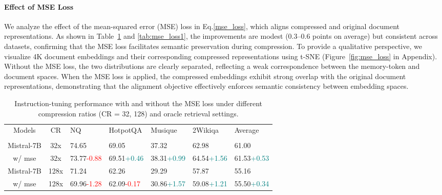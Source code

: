 \documentclass{applemlr}
\numberwithin{equation}{section}
\begin{document}
\paragraph{Effect of MSE Loss}



We analyze the effect of the mean-squared error (MSE) loss in Eq.\ref{mse_loss}, which aligns compressed and original document representations.
As shown in Table~\ref{tab:mse_loss} and \ref{tab:mse_loss1}, the improvements are modest (0.3–0.6 points on average) but consistent across datasets, confirming that the MSE loss facilitates semantic preservation during compression. To provide a qualitative perspective, we visualize 4K document embeddings and their corresponding compressed representations using t-SNE (Figure~\ref{fig:mse_loss} in Appendix). 
Without the MSE loss, the two distributions are clearly separated, reflecting a weak correspondence between the memory-token and document spaces. When the MSE loss is applied, the compressed embeddings exhibit strong overlap with the original document representations, demonstrating that the alignment objective effectively enforces semantic consistency between embedding spaces. 







\begin{table}[H]
\centering
\scriptsize
\begin{tabular}{cclllll}
\bottomrule
Models & CR & NQ & HotpotQA& Musique& 2Wikiqa & Average \\
\rowcolor{gray!15}
\multicolumn{7}{c}{\textbf{Oracle}} \\
Mistral-7B & 32x & 74.65 & 69.05 & 37.32 & 62.98 & 61.00 \\
\qquad w/ mse & 32x & 73.77{\tiny\textcolor{red}{-0.88}} & 69.51{\tiny\textcolor{teal}{+0.46}} & 38.31{\tiny\textcolor{teal}{+0.99}} & 64.54{\tiny\textcolor{teal}{+1.56}} & 61.53{\tiny\textcolor{teal}{+0.53}} \\
Mistral-7B & 128x & 71.24 & 62.26 & 29.29 & 57.87 & 55.16 \\
\qquad w/ mse & 128x & 69.96{\tiny\textcolor{red}{-1.28}} & 62.09{\tiny\textcolor{red}{-0.17}} & 30.86{\tiny\textcolor{teal}{+1.57}} & 59.08{\tiny\textcolor{teal}{+1.21}} & 55.50{\tiny\textcolor{teal}{+0.34}} \\
\hline
\end{tabular}
\caption{Instruction-tuning performance with and without the MSE loss under different compression ratios (CR = 32, 128) and oracle retrieval settings.}
\label{tab:mse_loss}
\end{table}
\end{document}
